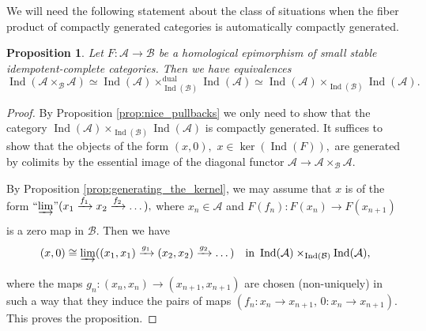 \documentclass[11pt,leqno]{amsart}
\newtheorem{prop}[theo]{Proposition}
\numberwithin{equation}{section}
\newcommand{\indlim}[1][]{\mathop{\varinjlim}\limits_{#1}}
\newcommand{\inddlim}[1][]{{``{\indlim[#1]}"}}
\newcommand{\xto}{\xrightarrow}
\newcommand{\Cone}{\operatorname{Cone}}
\newcommand{\Fiber}{\operatorname{Fiber}}
\newcommand{\dual}{\operatorname{dual}}
\newcommand{\cD}{{\mathcal D}}
\newcommand{\cA}{{\mathcal A}}
\newcommand{\cB}{{\mathcal B}}
\newcommand{\cC}{{\mathcal C}}
\newcommand{\Ind}{\operatorname{Ind}}
\newcommand{\id}{\operatorname{id}}
\begin{document}

We will need the following statement about the class of situations when the fiber product of compactly generated categories is automatically compactly generated.

\begin{prop}\label{prop:fiber_product_hom_epi} Let $F:\cA\to\cB$ be a homological epimorphism of small stable idempotent-complete categories. Then we have equivalences
$$\Ind(\cA\times_{\cB}\cA)\simeq \Ind(\cA)\times_{\Ind(\cB)}^{\dual}\Ind(\cA)\simeq \Ind(\cA)\times_{\Ind(\cB)}\Ind(\cA).$$\end{prop}

\begin{proof}By Proposition \ref{prop:nice_pullbacks} we only need to show that the category $\Ind(\cA)\times_{\Ind(\cB)}\Ind(\cA)$ is compactly generated. It suffices to show that the objects of the form $(x,0),$ $x\in\ker(\Ind(F)),$ are generated by colimits by the essential image of the diagonal functor $\cA\to\cA\times_{\cB}\cA.$

By Proposition \ref{prop:generating_the_kernel}, we may assume that $x$ is of the form $\inddlim[](x_1\xto{f_1} x_2\xto{f_2}\dots),$ where $x_n\in\cA$ and $F(f_n):F(x_n)\to F(x_{n+1})$ is a zero map in $\cB.$ Then we have
$$(x,0)\cong \indlim((x_1,x_1)\xto{g_1} (x_2,x_2)\xto{g_2}\dots)\quad\text{in }\Ind(\cA)\times_{\Ind(\cB)}\Ind(\cA),$$
where the maps $g_n:(x_n,x_n)\to (x_{n+1},x_{n+1})$ are chosen (non-uniquely) in such a way that they induce the pairs of maps $(f_n:x_n\to x_{n+1},\,0:x_n\to x_{n+1}).$ This proves the proposition.\end{proof}
\end{document}
